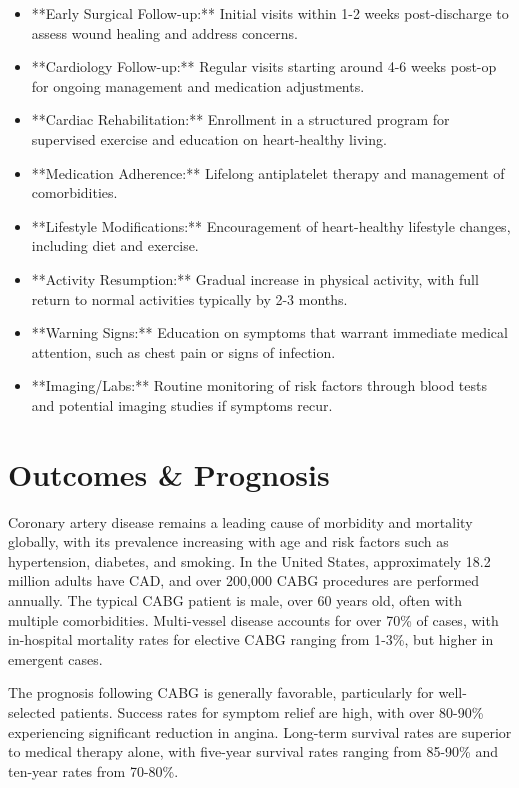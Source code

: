\begin{itemize}
  \item **Early Surgical Follow-up:** Initial visits within 1-2 weeks post-discharge to assess wound healing and address concerns.

  \item **Cardiology Follow-up:** Regular visits starting around 4-6 weeks post-op for ongoing management and medication adjustments.

  \item **Cardiac Rehabilitation:** Enrollment in a structured program for supervised exercise and education on heart-healthy living.

  \item **Medication Adherence:** Lifelong antiplatelet therapy and management of comorbidities.

  \item **Lifestyle Modifications:** Encouragement of heart-healthy lifestyle changes, including diet and exercise.

  \item **Activity Resumption:** Gradual increase in physical activity, with full return to normal activities typically by 2-3 months.

  \item **Warning Signs:** Education on symptoms that warrant immediate medical attention, such as chest pain or signs of infection.
  
  \item **Imaging/Labs:** Routine monitoring of risk factors through blood tests and potential imaging studies if symptoms recur.
\end{itemize}

\section*{Outcomes \& Prognosis}
Coronary artery disease remains a leading cause of morbidity and mortality globally, with its prevalence increasing with age and risk factors such as hypertension, diabetes, and smoking. In the United States, approximately 18.2 million adults have CAD, and over 200,000 CABG procedures are performed annually. The typical CABG patient is male, over 60 years old, often with multiple comorbidities. Multi-vessel disease accounts for over 70\% of cases, with in-hospital mortality rates for elective CABG ranging from 1-3\%, but higher in emergent cases.

The prognosis following CABG is generally favorable, particularly for well-selected patients. Success rates for symptom relief are high, with over 80-90\% experiencing significant reduction in angina. Long-term survival rates are superior to medical therapy alone, with five-year survival rates ranging from 85-90\% and ten-year rates from 70-80\%. 

